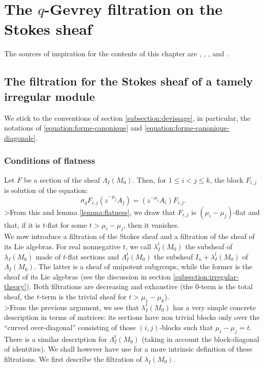 \documentclass[english]{smfart}
\numberwithin{equation}{thm}
\def\sq{\sigma_q}
\def\l{\left}
\def\r{\right}
\def\la{\lambda}
\def\La{\Lambda}
\begin{document}


\section{The $q$-Gevrey filtration on the Stokes sheaf}

The sources of inspiration for the contents of this chapter are
\cite{RamisGevrey}, \cite{BV}, \cite{MLR}, \cite{Varadarajan} and
\cite{Deligne86}. 


\subsection{The filtration for the Stokes sheaf of a tamely irregular module}

We stick to the conventions of section \ref{subsection:devissage},
in particular, the notations of \ref{equation:forme-canonique} and
\ref{equation:forme-canonique-diagonale}.

\subsubsection*{Conditions of flatness}

Let $F$ be a section of the sheaf $\La_{I}(M_{0})$. Then, 
for $1 \leq i < j \leq k$, the block $F_{i,j}$ is solution
of the equation:
$$ 
\sq F_{i,j} \l(z^{-\mu_{j}} A_{j}\r) = \l(z^{-\mu_{i}} A_{i}\r) F_{i,j}.
$$
>From this and lemma \ref{lemma:flatness}, we draw that $F_{i,j}$
is $(\mu_{i} - \mu_{j})$-flat and that, if it is $t$-flat for some
$t > \mu_{i} - \mu_{j}$, then it vanishes. \\

We now introduce a filtration of the Stokes sheaf and a filtration
of the sheaf of its Lie algebras. For real nonnegative $t$, we call 
$\la_{I}^{t}(M_{0})$ the subsheaf of $\la_{I}(M_{0})$ made of $t$-flat 
sections and $\La_{I}^{t}(M_{0})$ the subsheaf $I_{n} + \la_{I}^{t}(M_{0})$
of $\La_{I}(M_{0})$. The latter is a sheaf of unipotent subgroups,
while the former is the sheaf of its Lie algebras (see the discussion
in section \ref{subsection:irregular-theory}). Both filtrations
are decreasing and exhaustive (the $0$-term is the total sheaf, 
the $t$-term is the trivial sheaf for $t > \mu_{1} - \mu_{k}$). \\

>From the previous argument, we see that $\la_{I}^{t}(M_{0})$
has a very simple concrete description in terms of matrices: 
its sections have non trivial blocks only over the ``curved
over-diagonal'' consisting of those $(i,j)$-blocks such that
$\mu_{i} - \mu_{j} = t$. There is a similar description for
$\La_{I}^{t}(M_{0})$ (taking in account the block-diagonal
of identities). We shall however have use for a more intrinsic 
definition of these filtrations. We first describe the filtration 
of $\la_{I}(M_{0})$. 
\end{document}
